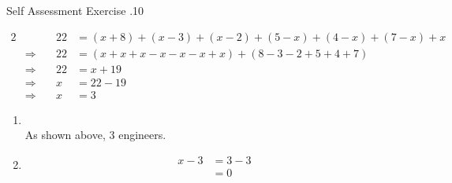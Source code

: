 \documentclass[\main/notes.tex]{subfiles}
\begin{document}
\begin{exercise}{Self Assessment Exercise \thechapter.10}
\begin{enumerate}
						\begin{alignat*}{2}
							& & 22 &= (x + 8) + (x - 3) + (x - 2) + (5 - x) + (4 - x) + (7 - x) + x\\
							& \Rightarrow \quad & 22 &= (x + x + x - x - x - x + x) + (8 - 3 - 2 + 5 + 4 + 7)\\
							& \Rightarrow \quad & 22 &= x + 19\\
							& \Rightarrow \quad & x &= 22 - 19\\
							& \Rightarrow \quad & x &= 3
						\end{alignat*}
						\begin{enumerate}
							\item {}\\
								As shown above, $3$ engineers.
							\item {}
								\begin{align*}
									x - 3 &= 3 - 3\\
									&= 0
								\end{align*}
						\end{enumerate}
					\end{enumerate}
				\end{exercise}
\end{document}
